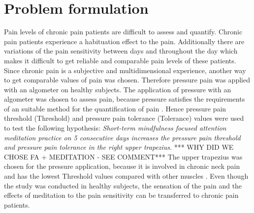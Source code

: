 \chapter{Problem formulation}

Pain levels of chronic pain patients are difficult to assess and quantify. Chronic pain patients experience a habituation effect to the pain. Additionally there are variations of the pain sensitivity between days and throughout the day which makes it difficult to get reliable and comparable pain levels of these patients. Since chronic pain is a subjective and multidimensional experience, another way to get comparable values of pain was chosen. Therefore pressure pain was applied with an algometer on healthy subjects. The application of pressure with an algometer was chosen to assess pain, because pressure satisfies the requirements of an suitable method for the quantification of pain \cite{Keele1954}. Hence pressure pain threshold (Threshold) and pressure pain tolerance (Tolerance) values were used to test the following hypothesis:
\textit{Short-term mindfulness focused attention meditation practice on 5 consecutive days increases the pressure pain threshold and pressure pain tolerance in the right upper trapezius}.  *** WHY DID WE CHOSE FA + MEDITATION -  SEE COMMENT*** The upper trapezius was chosen for the pressure application, because it is involved in chronic neck pain and has the lowest Threshold values compared with other muscles \cite{Falla2004,Fischer1987}. Even though the study was conducted in healthy subjects, the sensation of the pain and the effects of meditation to the pain sensitivity can be transferred to chronic pain patients.


